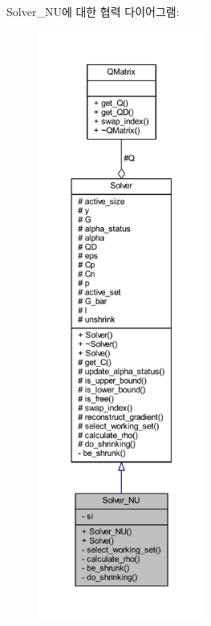 Solver\+\_\+\+N\+U에 대한 협력 다이어그램\+:
\nopagebreak
\begin{figure}[H]
\begin{center}
\leavevmode
\includegraphics[height=550pt]{class_solver___n_u__coll__graph}
\end{center}
\end{figure}
